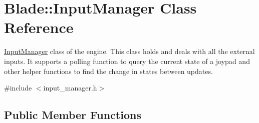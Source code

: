 \hypertarget{class_blade_1_1_input_manager}{}\section{Blade\+:\+:Input\+Manager Class Reference}
\label{class_blade_1_1_input_manager}


\hyperlink{class_blade_1_1_input_manager}{Input\+Manager} class of the engine. This class holds and deals with all the external inputs. It supports a polling function to query the current state of a joypad and other helper functions to find the change in states between updates.  




{\ttfamily \#include $<$input\+\_\+manager.\+h$>$}

\subsection*{Public Member Functions}
